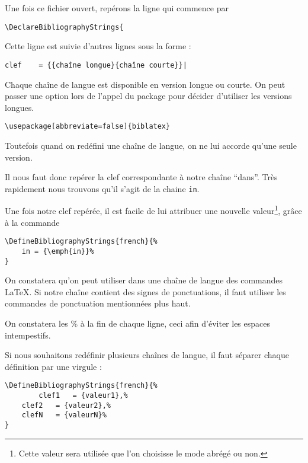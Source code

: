 	Une fois ce fichier ouvert, repérons la ligne qui commence par
	
	\begin{verbatim}
\DeclareBibliographyStrings{
	\end{verbatim}
	
	Cette ligne est suivie d'autres lignes sous la forme :
	
	\begin{verbatim}
clef	= {{chaîne longue}{chaîne courte}}|
	\end{verbatim}
	
	\begin{anedocte}
	Chaque chaîne de langue est disponible en version longue ou courte. On peut passer une option lors de l'appel du package  pour décider d'utiliser les versions longues.
	
	\begin{verbatim}
\usepackage[abbreviate=false]{biblatex}
	\end{verbatim}
	
	 Toutefois quand on redéfini une chaîne de langue, on ne lui accorde qu'une seule version.
	
		

	\end{anedocte}
	Il nous faut donc repérer la clef correspondante à notre chaîne \enquote{dans}. Très rapidement nous trouvons qu'il s'agit de la chaine \verb|in|.
	
	Une fois  notre clef repérée, il est facile de lui attribuer une nouvelle valeur\footnote{Cette valeur sera utilisée que l'on choisisse le mode abrégé ou non.}, grâce à la commande 
	
	\begin{verbatim}
\DefineBibliographyStrings{french}{%
	in = {\emph{in}}%
}
	\end{verbatim}
	
	On constatera qu'on peut utiliser dans une chaîne de langue des commandes \LaTeX. Si notre chaîne contient des signes de ponctuations, il faut utiliser les commandes de ponctuation mentionnées plus haut.
	
	On constatera les \% à la fin de chaque ligne, ceci afin d'éviter les espaces intempestifs.
	
	Si nous souhaitons redéfinir plusieurs chaînes de langue, il faut séparer chaque définition par une virgule :
	
	\begin{verbatim}
\DefineBibliographyStrings{french}{%
      	clef1 	= {valeur1},%
	clef2	= {valeur2},%
	clefN	= {valeurN}%
}
	\end{verbatim}
	
